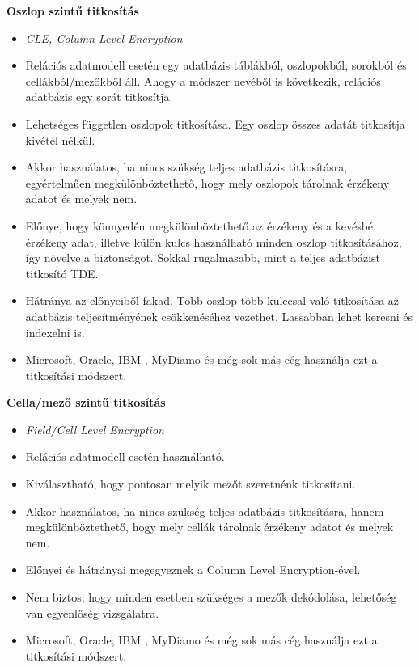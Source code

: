 \bigskip

\noindent\textbf{Oszlop szintű titkosítás}\newline
\begin{itemize}
	\item \textit{CLE, Column Level Encryption}
	\item Relációs adatmodell esetén egy adatbázis táblákból, oszlopokból, sorokból és cellákból/mezőkből áll. Ahogy a módszer nevéből is következik, relációs adatbázis egy sorát titkosítja.
	\item Lehetséges független oszlopok titkosítása. Egy oszlop összes adatát titkosítja kivétel nélkül. 
	\item Akkor használatos, ha nincs szükség teljes adatbázis titkosításra, egyértelműen megkülönböztethető, hogy mely oszlopok tárolnak érzékeny adatot és melyek nem.
	\item Előnye, hogy könnyedén megkülönböztethető az érzékeny és a kevésbé érzékeny adat, illetve külön kulcs használható minden oszlop titkosításához, így növelve a biztonságot. Sokkal rugalmasabb, mint a teljes adatbázist titkosító TDE.
	\item Hátránya az előnyeiből fakad. Több oszlop több kulccsal való titkosítása az adatbázis teljesítményének csökkenéséhez vezethet. Lassabban lehet keresni és indexelni is.
	\item Microsoft, Oracle, IBM , MyDiamo és még sok más cég használja ezt a titkosítási módszert.
\end{itemize}

\bigskip

\noindent\textbf{Cella/mező szintű titkosítás}
\begin{itemize}
	\item \textit{Field/Cell Level Encryption}
	\item Relációs adatmodell esetén használható.
	\item Kiválasztható, hogy pontosan melyik mezőt szeretnénk titkosítani. 
	\item Akkor használatos, ha nincs szükség teljes adatbázis titkosításra, hanem megkülönböztethető, hogy mely cellák tárolnak érzékeny adatot és melyek nem.
	\item Előnyei és hátrányai megegyeznek a Column Level Encryption-ével. 
	\item Nem biztos, hogy minden esetben szükséges a mezők dekódolása, lehetőség van egyenlőség vizsgálatra.
	\item Microsoft, Oracle, IBM , MyDiamo és még sok más cég használja ezt a titkosítási módszert.
\end{itemize}


